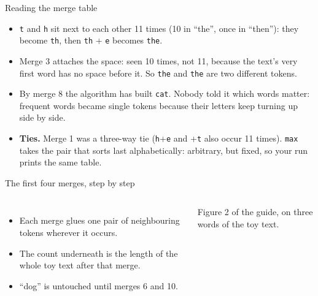 \documentclass[aspectratio=169,11pt,t,\primeropts]{beamer}
\newcommand\tok[1]{\texttt{#1}}
\newcommand\vsp{\textvisiblespace}%
\begin{document}
\begin{frame}{Reading the merge table}
  \begin{itemize}
    \item \tok{t} and \tok{h} sit next to each other 11 times (10 in ``the'', once in ``then''):
      they become \tok{th}, then \tok{th} + \tok{e} becomes \tok{the}.
    \item<2-> Merge 3 attaches the space: seen 10 times, not 11, because the text's very first word
      has no space before it. So \tok{the} and \tok{\vsp the} are two different tokens.
    \item<3-> By merge 8 the algorithm has built \tok{\vsp cat}. Nobody told it which words matter:
      frequent words became single tokens because their letters keep turning up side by side.
    \item<4-> \textbf{Ties.} Merge 1 was a three-way tie (\tok{h}+\tok{e} and \tok{\vsp}+\tok{t} also
      occur 11 times). \texttt{max} takes the pair that sorts last alphabetically: arbitrary, but
      fixed, so your run prints the same table.
  \end{itemize}
\end{frame}

\begin{frame}{The first four merges, step by step}
  \begin{columns}[c]
    \vspace{-3mm}
    \begin{itemize}
      \item Each merge glues one pair of neighbouring tokens wherever it occurs.
      \item The count underneath is the length of the whole toy text after that merge.
      \item ``dog'' is untouched until merges 6 and 10.
    \end{itemize}
    \vspace{2mm}
    {\footnotesize\color{primerMuted}Figure 2 of the guide, on three words of the toy text.\par}
  \end{columns}
\end{frame}
\end{document}
